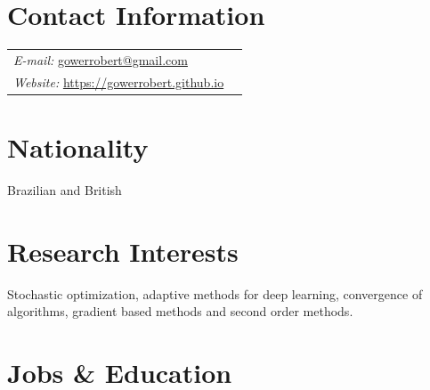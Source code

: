 
\section{Contact Information}
\newlength{\rcollength}\setlength{\rcollength}{2in}%
%
\begin{tabular}[t]{@{}p{\textwidth-\rcollength -0.5in}p{ \rcollength +1in}}    
	\textit{E-mail:}
	\href{gowerrobert@gmail.com}{gowerrobert@gmail.com}  & %
	\\
	\textit{Website:} \href{https://gowerrobert.github.io}{https://gowerrobert.github.io}  &\\
\end{tabular}

\vspace{-0.2cm}
\section{Nationality}
Brazilian and British

\section{Research Interests} 
Stochastic optimization, adaptive methods for deep learning, convergence of algorithms, gradient based methods and second order methods.
\section{Jobs \& Education}


